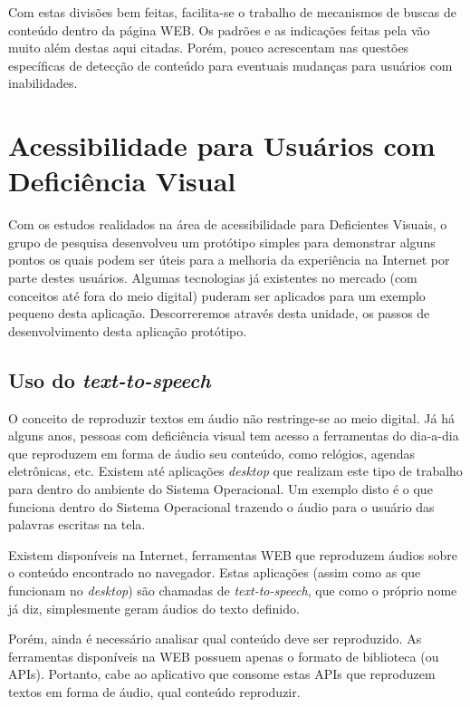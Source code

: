 \documentclass[
	12pt,				%
	oneside,			%
	a4paper,			%
	english,			%
	brazil				%
	]{abntex2ppgsi}
\begin{document}
Com estas divisões bem feitas, facilita-se o trabalho de mecanismos de buscas de conteúdo dentro da página WEB. Os padrões e as indicações feitas pela  vão muito além destas aqui citadas. Porém, pouco acrescentam nas questões específicas de detecção de conteúdo para eventuais mudanças para usuários com inabilidades.

\chapter{Acessibilidade para Usuários com Deficiência Visual}

Com os estudos realidados na área de acessibilidade para Deficientes Visuais, o grupo de pesquisa desenvolveu um protótipo simples para demonstrar alguns pontos os quais podem ser úteis para a melhoria da experiência na Internet por parte destes usuários. Algumas tecnologias já existentes no mercado (com conceitos até fora do meio digital) puderam ser aplicados para um exemplo pequeno desta aplicação. Descorreremos através desta unidade, os passos de desenvolvimento desta aplicação protótipo.

\section{Uso do \textit{text-to-speech}}

O conceito de reproduzir textos em áudio não restringe-se ao meio digital. Já há alguns anos, pessoas com deficiência visual tem acesso a ferramentas do dia-a-dia que reproduzem em forma de áudio seu conteúdo, como relógios, agendas eletrônicas, etc. Existem até aplicações \textit{desktop} que realizam este tipo de trabalho para dentro do ambiente do Sistema Operacional. Um exemplo disto é o  que funciona dentro do Sistema Operacional trazendo o áudio para o usuário das palavras escritas na tela. 

Existem disponíveis na Internet, ferramentas WEB que reproduzem áudios sobre o conteúdo encontrado no navegador. Estas aplicações (assim como as que funcionam no \textit{desktop}) são chamadas de \textit{text-to-speech}, que como o próprio nome já diz, simplesmente geram áudios do texto definido.

Porém, ainda é necessário analisar qual conteúdo deve ser reproduzido. As ferramentas disponíveis na WEB possuem apenas o formato de biblioteca (ou APIs). Portanto, cabe ao aplicativo que consome estas APIs que reproduzem textos em forma de áudio, qual conteúdo reproduzir.
\end{document}
